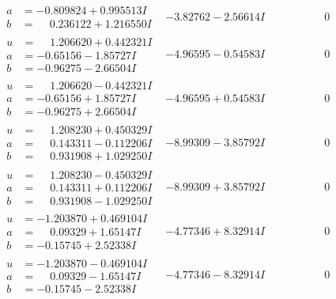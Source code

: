 \documentclass[1p]{elsarticle_modified}
\theoremstyle{definition}
\begin{document}
$$\begin{array}{c|c|c}
\begin{aligned}
a &= -0.809824 + 0.995513 I \\
b &= \phantom{-}0.236122 + 1.216550 I\end{aligned}
 & -3.82762 - 2.56614 I & \phantom{-0.000000 } 0 \\ \hline\begin{aligned}
u &= \phantom{-}1.206620 + 0.442321 I \\
a &= -0.65156 - 1.85727 I \\
b &= -0.96275 - 2.66504 I\end{aligned}
 & -4.96595 - 0.54583 I & \phantom{-0.000000 } 0 \\ \hline\begin{aligned}
u &= \phantom{-}1.206620 - 0.442321 I \\
a &= -0.65156 + 1.85727 I \\
b &= -0.96275 + 2.66504 I\end{aligned}
 & -4.96595 + 0.54583 I & \phantom{-0.000000 } 0 \\ \hline\begin{aligned}
u &= \phantom{-}1.208230 + 0.450329 I \\
a &= \phantom{-}0.143311 - 0.112206 I \\
b &= \phantom{-}0.931908 + 1.029250 I\end{aligned}
 & -8.99309 - 3.85792 I & \phantom{-0.000000 } 0 \\ \hline\begin{aligned}
u &= \phantom{-}1.208230 - 0.450329 I \\
a &= \phantom{-}0.143311 + 0.112206 I \\
b &= \phantom{-}0.931908 - 1.029250 I\end{aligned}
 & -8.99309 + 3.85792 I & \phantom{-0.000000 } 0 \\ \hline\begin{aligned}
u &= -1.203870 + 0.469104 I \\
a &= \phantom{-}0.09329 + 1.65147 I \\
b &= -0.15745 + 2.52338 I\end{aligned}
 & -4.77346 + 8.32914 I & \phantom{-0.000000 } 0 \\ \hline\begin{aligned}
u &= -1.203870 - 0.469104 I \\
a &= \phantom{-}0.09329 - 1.65147 I \\
b &= -0.15745 - 2.52338 I\end{aligned}
 & -4.77346 - 8.32914 I & \phantom{-0.000000 } 0 \\ \hline\begin{aligned}

\end{aligned}
\end{array}$$
\end{document}
